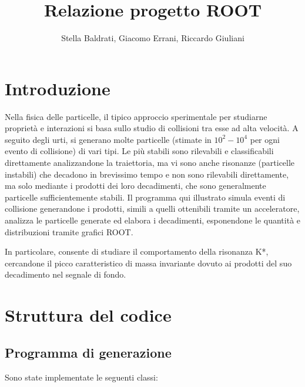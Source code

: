 \documentclass[12pt, a4paper]{article}
\title{Relazione progetto ROOT} %
\date{}
\author{Stella Baldrati, Giacomo Errani, Riccardo Giuliani}
\begin{document}
\maketitle

\section{Introduzione}

Nella fisica delle particelle, il tipico approccio sperimentale per studiarne proprietà e interazioni si basa sullo studio di collisioni tra esse ad alta velocità. A seguito degli urti, si generano molte particelle (stimate in $10^2-10^4$ per ogni evento di collisione) di vari tipi. 
\newline
Le più stabili sono rilevabili e classificabili direttamente analizzandone la traiettoria, ma vi sono anche risonanze (particelle instabili) che decadono in brevissimo tempo e non sono rilevabili direttamente, ma solo mediante i prodotti dei loro decadimenti, che sono generalmente particelle sufficientemente stabili.
\newline
Il programma qui illustrato simula eventi di collisione generandone i prodotti, simili a quelli ottenibili tramite un acceleratore, analizza le particelle generate ed elabora i decadimenti, esponendone le quantità e distribuzioni tramite grafici ROOT. 

In particolare, consente di studiare il comportamento della risonanza K*, cercandone il picco caratteristico di massa invariante dovuto ai prodotti del suo decadimento nel segnale di fondo.

\section{Struttura del codice}

\subsection{Programma di generazione}

Sono state implementate le seguenti classi:
\end{document}

